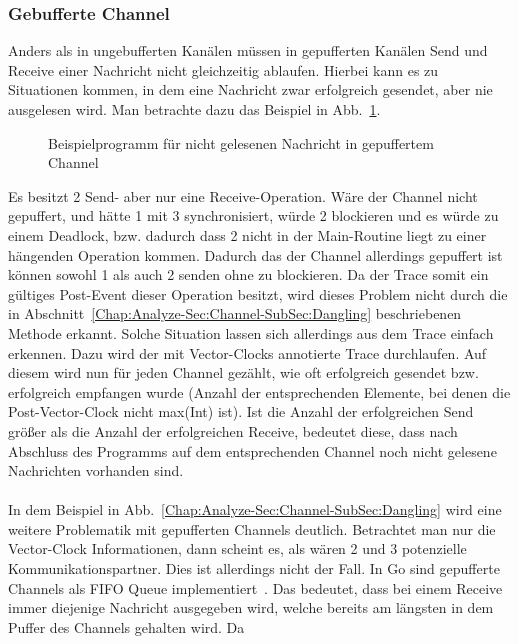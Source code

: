 \subsubsection{Gebufferte Channel}\label{Chan:Analyze-Sec:Channel-SubSec:Buffered}
Anders als in ungebufferten Kanälen müssen in gepufferten Kanälen Send und 
Receive einer Nachricht nicht gleichzeitig ablaufen. Hierbei kann es 
zu Situationen kommen, in dem eine Nachricht zwar erfolgreich gesendet, aber
nie ausgelesen wird. Man betrachte dazu das Beispiel in 
Abb.~\ref{Chap:Analyze-Sec:Channel-SubSec:Buffered-Fig:Ex1}.
\begin{figure}[h!]
  
  \caption{Beispielprogramm für nicht gelesenen Nachricht in gepuffertem Channel} 
  \label{Chap:Analyze-Sec:Channel-SubSec:Buffered-Fig:Ex1}
\end{figure}
Es besitzt 2 Send- aber nur eine Receive-Operation. Wäre der Channel nicht 
gepuffert, und hätte 1 mit 3 synchronisiert, würde 2 blockieren und es 
würde zu einem Deadlock, bzw. dadurch dass 2 nicht in der Main-Routine liegt
zu einer hängenden Operation kommen. Dadurch das der Channel allerdings gepuffert ist
können sowohl 1 als auch 2 senden ohne zu blockieren. Da der Trace somit ein gültiges Post-Event dieser Operation besitzt, 
wird dieses Problem nicht durch die in 
Abschnitt~\ref{Chap:Analyze-Sec:Channel-SubSec:Dangling} beschriebenen Methode erkannt.
Solche Situation lassen sich allerdings aus dem Trace einfach erkennen.
Dazu wird der mit Vector-Clocks annotierte Trace durchlaufen. Auf diesem 
wird nun für jeden Channel gezählt, wie oft erfolgreich gesendet bzw. erfolgreich empfangen 
wurde (Anzahl der entsprechenden Elemente, bei denen die Post-Vector-Clock 
nicht max(Int) ist). Ist die Anzahl der erfolgreichen Send größer als 
die Anzahl der erfolgreichen Receive, bedeutet diese, dass nach Abschluss des 
Programms auf dem entsprechenden Channel noch nicht gelesene Nachrichten vorhanden sind.\\\\
In dem Beispiel in Abb.~\ref{Chap:Analyze-Sec:Channel-SubSec:Dangling}
wird eine weitere Problematik mit gepufferten Channels deutlich. 
Betrachtet man nur die Vector-Clock Informationen, dann scheint es, als wären 
2 und 3 potenzielle Kommunikationspartner. Dies ist allerdings nicht der Fall. 
In Go sind gepufferte Channels als FIFO Queue implementiert~\cite{chan-impl}. 
Das bedeutet, dass bei einem Receive immer diejenige Nachricht ausgegeben wird, 
welche bereits am längsten in dem Puffer des Channels gehalten wird. Da 
